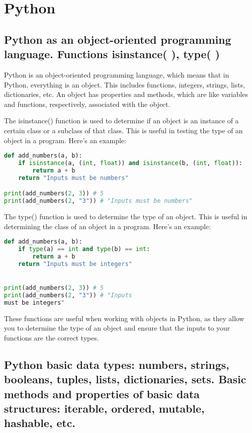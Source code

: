 \documentclass[12pt, a4paper, oneside]{article}
\begin{document}
\section{Python}
\subsection{ Python as an object-oriented programming language. Functions isinstance( ), type( ) }
Python is an object-oriented programming language, which means that in Python, everything is an object. This includes functions, integers, strings, lists, dictionaries, etc. An object has properties and methods, which are like variables and functions, respectively, associated with the object.

The isinstance() function is used to determine if an object is an instance of a certain class or a subclass of that class. This is useful in testing the type of an object in a program. Here's an example:

\begin{lstlisting}[language=Python, frame=single]
def add_numbers(a, b):
    if isinstance(a, (int, float)) and isinstance(b, (int, float)):
        return a + b
    return "Inputs must be numbers"

print(add_numbers(2, 3)) # 5
print(add_numbers(2, "3")) # "Inputs must be numbers"
\end{lstlisting}
The type() function is used to determine the type of an object. This is useful in determining the class of an object in a program. Here's an example:

\begin{lstlisting}[language=Python, frame=single]
def add_numbers(a, b):
    if type(a) == int and type(b) == int:
        return a + b
    return "Inputs must be integers"


print(add_numbers(2, 3)) # 5
print(add_numbers(2, "3")) # "Inputs 
must be integers"
\end{lstlisting}
These functions are useful when working with objects in Python, as they allow you to determine the type of an object and ensure that the inputs to your functions are the correct types.

\subsection{ Python basic data types: numbers, strings, booleans, tuples, lists, dictionaries, sets. Basic methods and properties of basic data structures: iterable, ordered, mutable, hashable, etc. }
\end{document}

